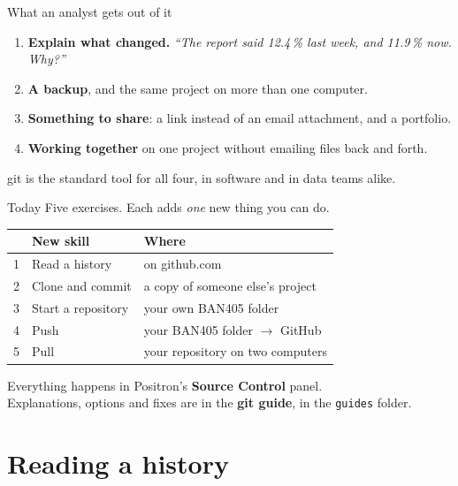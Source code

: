 \documentclass[aspectratio=169,11pt]{beamer}
\newcommand{\code}[1]{\texttt{#1}}
\newcommand{\key}[1]{\textbf{\textcolor{ban}{#1}}}
\newcommand{\ui}[1]{\textbf{#1}}
\begin{document}
\begin{frame}{What an analyst gets out of it}
  \begin{enumerate}
    \item \textbf{Explain what changed.} \emph{``The report said 12.4\,\% last week, and 11.9\,\% now. Why?''}
    \item \textbf{A backup}, and the same project on more than one computer.
    \item \textbf{Something to share}: a link instead of an email attachment, and a portfolio.
    \item \textbf{Working together} on one project without emailing files back and forth.
  \end{enumerate}
  \vspace{1em}
  git is the standard tool for all four, in software and in data teams alike.
\end{frame}

\begin{frame}{Today}
  Five exercises. Each adds \emph{one} new thing you can do.
  \vspace{0.8em}

  \centering
  \begin{tabular}{c l l}
    & \textbf{New skill} & \textbf{Where} \\ \hline
    1 & Read a history & on github.com \\
    2 & Clone and commit & a copy of someone else's project \\
    3 & Start a repository & your own BAN405 folder \\
    4 & Push & your BAN405 folder $\rightarrow$ GitHub \\
    5 & Pull & your repository on two computers \\
  \end{tabular}

  \vspace{1em}
  \raggedright
  Everything happens in Positron's \ui{Source Control} panel.\\
  Explanations, options and fixes are in the \key{git guide}, in the \code{guides} folder.
\end{frame}

\section{Reading a history}
\end{document}
